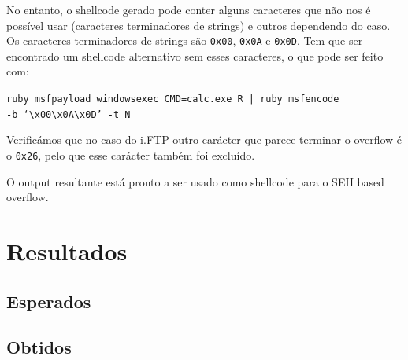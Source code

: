 \documentclass[a4paper]{article}
\begin{document}
No entanto, o shellcode gerado pode conter alguns caracteres que não nos é possível usar (caracteres terminadores de strings) e outros dependendo do caso. Os caracteres terminadores de strings são \texttt{0x00}, \texttt{0x0A} e \texttt{0x0D}. Tem que ser encontrado um shellcode alternativo sem esses caracteres, o que pode ser feito com:

	\texttt{ruby msfpayload windows\/exec CMD=calc.exe R | ruby msfencode \\ -b `\textbackslash x00\textbackslash x0A\textbackslash x0D' -t N}

Verificámos que no caso do i.FTP outro carácter que parece terminar o overflow é o \texttt{0x26}, pelo que esse carácter também foi excluído.

O output resultante está pronto a ser usado como shellcode para o SEH based overflow.


\pagebreak
\section{Resultados}

\subsection{Esperados}
\subsection{Obtidos}


\pagebreak

\nocite{CorelanTeam, refx86asm, genSEHexploits, AMD64vol3_2013}
\end{document}
